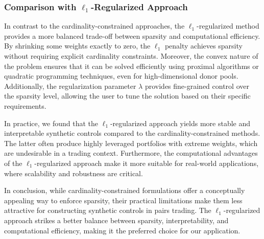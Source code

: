 \subsubsection{Comparison with $\ell_1$-Regularized Approach}
In contrast to the cardinality-constrained approaches, the $\ell_1$-regularized method provides a more balanced trade-off between sparsity and computational efficiency. By shrinking some weights exactly to zero, the $\ell_1$ penalty achieves sparsity without requiring explicit cardinality constraints. Moreover, the convex nature of the problem ensures that it can be solved efficiently using proximal algorithms or quadratic programming techniques, even for high-dimensional donor pools. Additionally, the regularization parameter $\lambda$ provides fine-grained control over the sparsity level, allowing the user to tune the solution based on their specific requirements.

In practice, we found that the $\ell_1$-regularized approach yields more stable and interpretable synthetic controls compared to the cardinality-constrained methods. The latter often produce highly leveraged portfolios with extreme weights, which are undesirable in a trading context. Furthermore, the computational advantages of the $\ell_1$-regularized approach make it more suitable for real-world applications, where scalability and robustness are critical.

In conclusion, while cardinality-constrained formulations offer a conceptually appealing way to enforce sparsity, their practical limitations make them less attractive for constructing synthetic controls in pairs trading. The $\ell_1$-regularized approach strikes a better balance between sparsity, interpretability, and computational efficiency, making it the preferred choice for our application.



